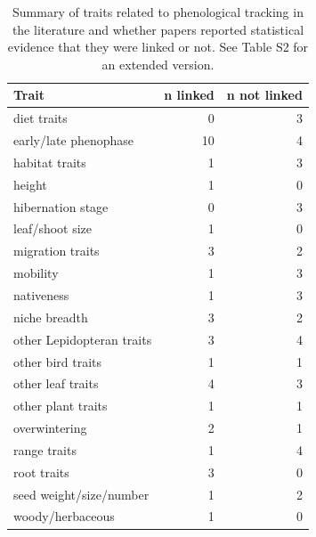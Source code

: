 \documentclass[11pt,letter]{article}
\begin{document}
 
\clearpage
\begin{table}[ht]
\centering
\caption{Summary of traits related to phenological tracking in the literature and whether papers reported statistical evidence that they were linked or not. See Table S2 for an extended version.} 
\label{tab:meta1}
\begingroup\footnotesize
\begin{tabular}{lrr}
  \hline
Trait & n linked & n not linked \\ 
  \hline
diet traits &   0 &   3 \\ 
  early/late phenophase &  10 &   4 \\ 
  habitat traits &   1 &   3 \\ 
  height &   1 &   0 \\ 
  hibernation stage &   0 &   3 \\ 
  leaf/shoot size &   1 &   0 \\ 
  migration traits &   3 &   2 \\ 
  mobility &   1 &   3 \\ 
  nativeness &   1 &   3 \\ 
  niche breadth &   3 &   2 \\ 
  other Lepidopteran traits &   3 &   4 \\ 
  other bird traits &   1 &   1 \\ 
  other leaf traits &   4 &   3 \\ 
  other plant traits &   1 &   1 \\ 
  overwintering &   2 &   1 \\ 
  range traits &   1 &   4 \\ 
  root traits &   3 &   0 \\ 
  seed weight/size/number &   1 &   2 \\ 
  woody/herbaceous &   1 &   0 \\ 
   \hline
\end{tabular}
\endgroup
\end{table}%
\end{document}
